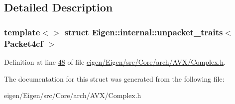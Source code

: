 \subsection{Detailed Description}
\subsubsection*{template$<$$>$\newline
struct Eigen\+::internal\+::unpacket\+\_\+traits$<$ Packet4cf $>$}



Definition at line \hyperlink{eigen_2_eigen_2src_2_core_2arch_2_a_v_x_2_complex_8h_source_l00048}{48} of file \hyperlink{eigen_2_eigen_2src_2_core_2arch_2_a_v_x_2_complex_8h_source}{eigen/\+Eigen/src/\+Core/arch/\+A\+V\+X/\+Complex.\+h}.



The documentation for this struct was generated from the following file\+:\begin{DoxyCompactItemize}
\item 
eigen/\+Eigen/src/\+Core/arch/\+A\+V\+X/\+Complex.\+h\end{DoxyCompactItemize}
